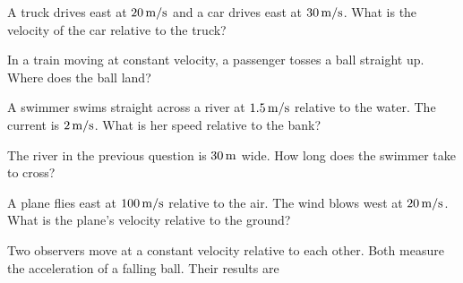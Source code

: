 \begin{exo}{}
A truck drives east at $20\,\mathrm{m/s}$ and a car drives east at $30\,\mathrm{m/s}$. What is the velocity of the car relative to the truck?
\end{exo}
\begin{exo}{}
In a train moving at constant velocity, a passenger tosses a ball straight up. Where does the ball land?
\end{exo}
\begin{exo}{}
A swimmer swims straight across a river at $1.5\,\mathrm{m/s}$ relative to the water. The current is $2\,\mathrm{m/s}$. What is her speed relative to the bank?
\choices{$2.5\ms$}{$0.5\ms$}{$3.5\ms$}{$3\ms$}
\end{exo}
\begin{exo}{}
The river in the previous question is $30\,\mathrm{m}$ wide. How long does the swimmer take to cross?
\choices{$12\s$}{$15\s$}{$60\s$}{$20\s$}
\end{exo}
\begin{exo}{}
A plane flies east at $100\,\mathrm{m/s}$ relative to the air. The wind blows west at $20\,\mathrm{m/s}$. What is the plane's velocity relative to the ground?
\end{exo}
\begin{exo}{}
Two observers move at a constant velocity relative to each other. Both measure the acceleration of a falling ball. Their results are
\end{exo}


